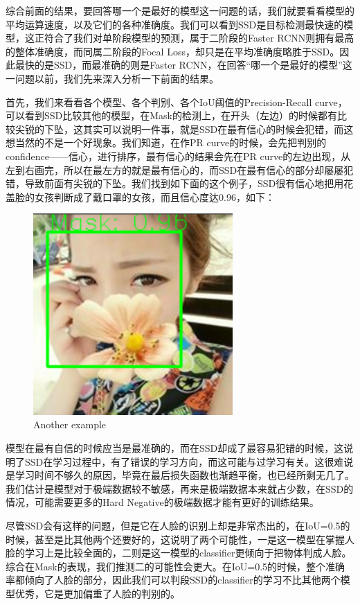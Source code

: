 \documentclass[journal,transmag]{IEEEtran}
\begin{document}
综合前面的结果，要回答哪一个是最好的模型这一问题的话，我们就要看看模型的平均运算速度，以及它们的各种准确度。我们可以看到SSD是目标检测最快速的模型，这正符合了我们对单阶段模型的预测，属于二阶段的Faster RCNN则拥有最高的整体准确度，而同属二阶段的Focal Loss，却只是在平均准确度略胜于SSD。因此最快的是SSD，而最准确的则是Faster RCNN，在回答“哪一个是最好的模型”这一问题以前，我们先来深入分析一下前面的结果。

首先，我们来看看各个模型、各个判别、各个IoU阈值的Precision-Recall curve，可以看到SSD比较其他的模型，在Mask的检测上，在开头（左边）的时候都有比较尖锐的下坠，这其实可以说明一件事，就是SSD在最有信心的时候会犯错，而这想当然的不是一个好现象。我们知道，在作PR curve的时候，会先把判别的confidence——信心，进行排序，最有信心的结果会先在PR curve的左边出现，从左到右画完，所以在最左方的就是最有信心的，而SSD在最有信心的部分却屡屡犯错，导致前面有尖锐的下坠。我们找到如下面的这个例子，SSD很有信心地把用花盖脸的女孩判断成了戴口罩的女孩，而且信心度达0.96，如下：
\begin{figure}[h]
\centering
\includegraphics[width=3in]{discuss.png}
\caption{Another example}
\end{figure}

模型在最有自信的时候应当是最准确的，而在SSD却成了最容易犯错的时候，这说明了SSD在学习过程中，有了错误的学习方向，而这可能与过学习有关。这很难说是学习时间不够久的原因，毕竟在最后损失函数也渐趋平衡，也已经所剩无几了。我们估计是模型对于极端数据较不敏感，再来是极端数据本来就占少数，在SSD的情况，可能需要更多的Hard Negative的极端数据才能有更好的训练结果。

尽管SSD会有这样的问题，但是它在人脸的识别上却是非常杰出的，在IoU=0.5的时候，甚至是比其他两个还要好的，这说明了两个可能性，一是这一模型在掌握人脸的学习上是比较全面的，二则是这一模型的classifier更倾向于把物体判成人脸。综合在Mask的表现，我们推测二的可能性会更大。在IoU=0.5的时候，整个准确率都倾向了人脸的部分，因此我们可以判段SSD的classifier的学习不比其他两个模型优秀，它是更加偏重了人脸的判别的。
\end{document}
